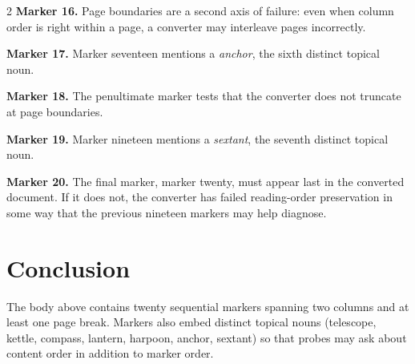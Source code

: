 \documentclass[12pt]{article}
\begin{document}
\begin{multicols}{2}
\textbf{Marker 16.} Page boundaries are a second axis of failure: even when
column order is right within a page, a converter may interleave pages
incorrectly.

\textbf{Marker 17.} Marker seventeen mentions a \emph{anchor}, the sixth
distinct topical noun.

\textbf{Marker 18.} The penultimate marker tests that the converter does not
truncate at page boundaries.

\textbf{Marker 19.} Marker nineteen mentions a \emph{sextant}, the seventh
distinct topical noun.

\textbf{Marker 20.} The final marker, marker twenty, must appear last in the
converted document. If it does not, the converter has failed reading-order
preservation in some way that the previous nineteen markers may help
diagnose.

\end{multicols}

\section{Conclusion}

The body above contains twenty sequential markers spanning two columns and
at least one page break. Markers also embed distinct topical nouns
(telescope, kettle, compass, lantern, harpoon, anchor, sextant) so that
probes may ask about content order in addition to marker order.
\end{document}
